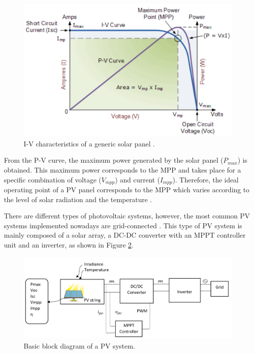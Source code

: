 \begin{figure}[htbp]
	\begin{center}
		\includegraphics[width=0.88\linewidth]{../Pictures/IVcurve}
		\caption{I-V characteristics of a generic solar panel \cite{IVcurves}.}
		\label{fig:mpp}
	\end{center}
\end{figure}

From the P-V curve, the maximum power generated by the solar panel ($P_{max}$) is obtained. This maximum power corresponds to the MPP and takes place for a specific combination of voltage ($V_{mpp}$) and current ($I_{mpp}$). Therefore, the ideal operating point of a PV panel corresponds to the MPP which varies according to the level of solar radiation and the temperature \cite{handbook}. 

\newpage
There are different types of photovoltaic systems, however, the most common PV systems implemented nowadays are grid-connected \cite{handbook}. This type of PV system is mainly composed of a solar array, a DC-DC converter with an MPPT controller unit and an inverter, as shown in Figure \ref{fig:PVsystemblocks}. 

\begin{figure}[htbp]
	\includegraphics[width=\linewidth]{../Pictures/PV_system_blocks}
	\caption{Basic block diagram of a PV system.}
	\label{fig:PVsystemblocks}
\end{figure}

